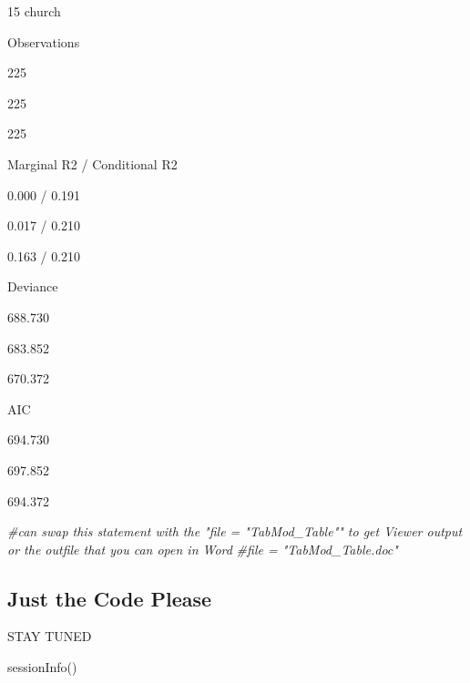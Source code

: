 \documentclass[
  11pt,
]{book}
\newenvironment{Shaded}{\begin{snugshade}}{\end{snugshade}}
\newcommand{\CommentTok}[1]{\textcolor[rgb]{0.56,0.35,0.01}{\textit{#1}}}
\newcommand{\FunctionTok}[1]{\textcolor[rgb]{0.00,0.00,0.00}{#1}}
\newcommand{\NormalTok}[1]{#1}
\begin{document}
15 church

Observations

225

225

225

Marginal R2 / Conditional R2

0.000 / 0.191

0.017 / 0.210

0.163 / 0.210

Deviance

688.730

683.852

670.372

AIC

694.730

697.852

694.372

\begin{Shaded}
\begin{Highlighting}[]
\CommentTok{\#can swap this statement with the "file = "TabMod\_Table"" to get Viewer output or the outfile that you can open in Word}
\CommentTok{\#file = "TabMod\_Table.doc"}
\end{Highlighting}
\end{Shaded}

\hypertarget{just-the-code-please}{%
\subsection{Just the Code Please}\label{just-the-code-please}}

STAY TUNED

\begin{Shaded}
\begin{Highlighting}[]
\FunctionTok{sessionInfo}\NormalTok{()}
\end{Highlighting}
\end{Shaded}
\end{document}
